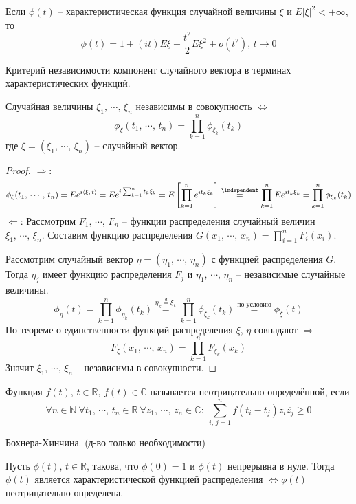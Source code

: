 \begin{corollary}
	Если $\phi(t)$ -- характеристическая функция случайной величины $\xi$ и $E|\xi|^2 < +\infty$, то
	\[\phi(t) = 1 + (it)E\xi - \frac{t^2}{2}E\xi^2 + \overline{o}(t^2),\, t \to 0\]
\end{corollary}

\begin{theorem}
	Критерий независимости компонент случайного вектора в терминах характеристических функций.

	Случайная величины $\xi_1,\,\cdots,\,\xi_n$ независимы в совокупность $\Leftrightarrow$
	\[\phi_\xi(t_1,\,\cdots,\,t_n) = \prod_{k = 1}^n \phi_{\xi_k}(t_k)\]
	где $\xi = (\xi_1,\,\cdots,\,\xi_n)$ -- случайный вектор.
\end{theorem}

\begin{proof}
	$\Rightarrow$:
	\[
		\phi_\xi(t_1,\,\cdots,\,t_n) = Ee^{i\langle\xi,\, t\rangle} = Ee^{i\sum_{k = 1}^n t_k\xi_k} = E\left[\prod_{k = 1}^n e^{it_k\xi_k}\right] \stackrel{\independent}{=} \prod_{k = 1}^n Ee^{it_k\xi_k} = \prod_{k = 1}^n \phi_{\xi_k}(t_k)
	\]
  $\Leftarrow$: Рассмотрим $F_1,\,\cdots,\,F_n$ -- функции распределения случайный величин $\xi_1,\,\cdots,\,\xi_n$. Составим функцию распределения $G(x_1,\,\cdots,\,x_n) = \prod_{i = 1}^nF_i(x_i)$. 
  
  Рассмотрим случайный вектор $\eta = (\eta_1,\,\cdots,\,\eta_n)$ с функцией распределения $G$. Тогда $\eta_j$ имеет функцию распределения $F_j$ и $\eta_1,\,\cdots,\,\eta_n$ -- независимые случайные величины.
  \[\phi_\eta(t) = \prod_{k = 1}^n \phi_{\eta_k}(t_k) \stackrel{\eta_k \stackrel{d}{=} \xi_k}{=} \prod_{k = 1}^n \phi_{\xi_k}(t_k) \stackrel{\text{по условию}}{=} \phi_\xi(t)\]
  По теореме о единственности функций распределения $\xi,\, \eta$ совпадают $\Rightarrow$
  \[F_\xi(x_1,\,\cdots,\,x_n) = \prod_{k = 1}^n F_{\xi_k}(x_k)\]
  Значит $\xi_1,\,\cdots,\,\xi_n$ -- независимы в совокупности. 
\end{proof}

\begin{definition}
  Функция $f(t),\, t \in \mathbb{R},\, f(t) \in \mathbb{C}$ называется неотрицательно определённой, если
  \[\forall n \in \mathbb{N} \: \forall t_1,\,\cdots,\,t_n \in \mathbb{R} \: \forall z_1,\,\cdots,\,z_n \in \mathbb{C} :\: \sum_{i,\,j = 1}^n f(t_i - t_j)z_i\overline{z_j} \geq 0\]
\end{definition}

\begin{theorem}
  Бохнера-Хинчина. (д-во только необходимости)

  Пусть $\phi(t),\, t \in \mathbb{R}$, такова, что $\phi(0) = 1$ и $\phi(t)$ непрерывна в нуле. Тогда $\phi(t)$ является характеристической функцией распределения $\Leftrightarrow \phi(t)$ неотрицательно определена.
\end{theorem}


